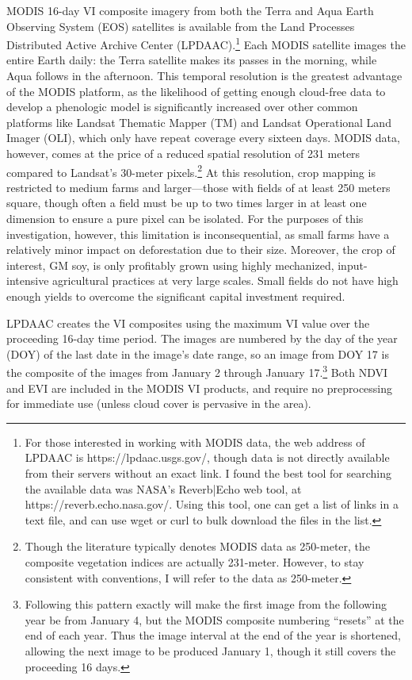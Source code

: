 MODIS 16-day VI composite imagery from both the Terra and Aqua Earth Observing System (EOS) satellites is available from the Land Processes Distributed Active Archive Center (LPDAAC).\footnote{For those interested in working with MODIS data, the web address of LPDAAC is https://lpdaac.usgs.gov/, though data is not directly available from their servers without an exact link. I found the best tool for searching the available data was NASA’s Reverb|Echo web tool, at https://reverb.echo.nasa.gov/. Using this tool, one can get a list of links in a text file, and can use wget or curl to bulk download the files in the list.} Each MODIS satellite images the entire Earth daily: the Terra satellite makes its passes in the morning, while Aqua follows in the afternoon. This temporal resolution is the greatest advantage of the MODIS platform, as the likelihood of getting enough cloud-free data to develop a phenologic model is significantly increased over other common platforms like Landsat Thematic Mapper (TM) and Landsat Operational Land Imager (OLI), which only have repeat coverage every sixteen days. MODIS data, however, comes at the price of a reduced spatial resolution of 231 meters compared to Landsat’s 30-meter pixels.\footnote{Though the literature typically denotes MODIS data as 250-meter, the composite vegetation indices are actually 231-meter. However, to stay consistent with conventions, I will refer to the data as 250-meter.} At this resolution, crop mapping is restricted to medium farms and larger---those with fields of at least 250 meters square, though often a field must be up to two times larger in at least one dimension to ensure a pure pixel can be isolated. For the purposes of this investigation, however, this limitation is inconsequential, as small farms have a relatively minor impact on deforestation due to their size. Moreover, the crop of interest, GM soy, is only profitably grown using highly mechanized, input-intensive agricultural practices at very large scales. Small fields do not have high enough yields to overcome the significant capital investment required. \todo[inline]{NEED A SOURCE FOR THIS---TALK TO POLO]}

LPDAAC creates the VI composites using the maximum VI value over the proceeding 16-day time period. The images are numbered by the day of the year (DOY) of the last date in the image's date range, so an image from DOY 17 is the composite of the images from January 2 through January 17.\footnote{Following this pattern exactly will make the first image from the following year be from January 4, but the MODIS composite numbering ``resets'' at the end of each year. Thus the image interval at the end of the year is shortened, allowing the next image to be produced January 1, though it still covers the proceeding 16 days.} Both NDVI and EVI are included in the MODIS VI products, and require no preprocessing for immediate use (unless cloud cover is pervasive in the area).

